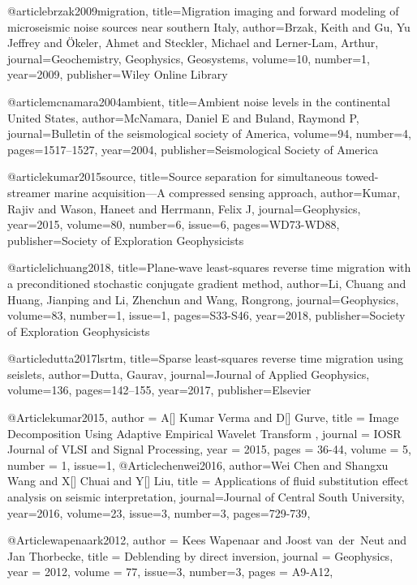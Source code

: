 @article{brzak2009migration,
  title={Migration imaging and forward modeling of microseismic noise sources near southern Italy},
  author={Brzak, Keith and Gu, Yu Jeffrey and {\"O}keler, Ahmet and Steckler, Michael and Lerner-Lam, Arthur},
  journal={Geochemistry, Geophysics, Geosystems},
  volume={10},
  number={1},
  year={2009},
  publisher={Wiley Online Library}
}


@article{mcnamara2004ambient,
  title={Ambient noise levels in the continental United States},
  author={McNamara, Daniel E and Buland, Raymond P},
  journal={Bulletin of the seismological society of America},
  volume={94},
  number={4},
  pages={1517--1527},
  year={2004},
  publisher={Seismological Society of America}
}




@article{kumar2015source,
  title={Source separation for simultaneous towed-streamer marine acquisition—A compressed sensing approach},
  author={Kumar, Rajiv and Wason, Haneet and Herrmann, Felix J},
  journal={Geophysics},
  year={2015},
  volume=80,
  number=6,
  issue=6,
  pages={WD73-WD88},
  publisher={Society of Exploration Geophysicists}
}

@article{lichuang2018,
  title={Plane-wave least-squares reverse time migration with a preconditioned stochastic conjugate gradient method},
  author={Li, Chuang and Huang, Jianping and Li, Zhenchun and Wang, Rongrong},
  journal={Geophysics},
  volume={83},
  number={1},
  issue=1,
  pages={S33-S46},
  year={2018},
  publisher={Society of Exploration Geophysicists}
}


@article{dutta2017lsrtm,
  title={Sparse least-squares reverse time migration using seislets},
  author={Dutta, Gaurav},
  journal={Journal of Applied Geophysics},
  volume={136},
  pages={142--155},
  year={2017},
  publisher={Elsevier}
}


@Article{kumar2015,
  author = 	 {A[] Kumar Verma and D[] Gurve},
  title = 	 {Image Decomposition Using Adaptive Empirical Wavelet Transform  
},
  journal = 	 {IOSR Journal of VLSI and Signal Processing},
  year = 	 2015,
  pages =	 {36-44},
  volume =    {5},
  number =    {1},
  issue=1,
}
@Article{chenwei2016,
  author={Wei Chen and Shangxu Wang and X[] Chuai and Y[] Liu},
  title = {Applications of fluid substitution effect analysis on seismic interpretation},
  journal={Journal of Central South University},
  year=2016,
  volume=23,
  issue=3,
  number=3,
  pages={729-739},
}

@Article{wapenaark2012,
  author = 	 {Kees Wapenaar and Joost van~der~Neut and Jan Thorbecke},
  title = 	 {Deblending by direct inversion},
  journal = 	 {Geophysics},
  year = 	 2012,
  volume =	 77,
  issue=3,
  number=3,
  pages =	 {A9-A12},
}

